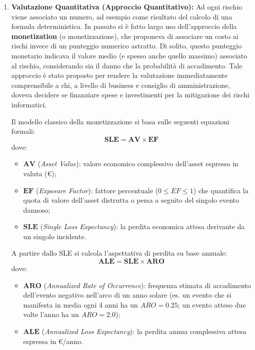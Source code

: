 \documentclass[../../main.tex]{subfiles}
\begin{document}
\begin{enumerate}
    \item \textbf{Valutazione Quantitativa (Approccio Quantitativo):} Ad ogni rischio viene associato un numero, ad esempio come risultato del calcolo di una formula deterministica. In passato si è fatto largo uso dell'approccio della \textbf{monetization} (o monetizzazione), che proponeva di associare un costo ai rischi invece di un punteggio numerico astratto. Di solito, questo punteggio monetario indicava il valore medio (e spesso anche quello massimo) associato al rischio, considerando sia il danno che la probabilità di accadimento. Tale approccio è stato proposto per rendere la valutazione immediatamente comprensibile a chi, a livello di business e consiglio di amministrazione, doveva decidere se finanziare spese e investimenti per la mitigazione dei rischi informatici.
    
    Il modello classico della monetizzazione si basa sulle seguenti equazioni formali:
    \begin{equation}
        \mathbf{SLE} = \mathbf{AV} \times \mathbf{EF}
    \end{equation}
    dove:
    \begin{itemize}
        \item $\mathbf{AV}$ (\textit{Asset Value}): valore economico complessivo dell'asset espresso in valuta (\euro);
        \item $\mathbf{EF}$ (\textit{Exposure Factor}): fattore percentuale ($0 \le EF \le 1$) che quantifica la quota di valore dell'asset distrutta o persa a seguito del singolo evento dannoso;
        \item $\mathbf{SLE}$ (\textit{Single Loss Expectancy}): la perdita economica attesa derivante da un singolo incidente.
    \end{itemize}
    
    A partire dallo SLE si calcola l'aspettativa di perdita su base annuale:
    \begin{equation}
        \mathbf{ALE} = \mathbf{SLE} \times \mathbf{ARO}
    \end{equation}
    dove:
    \begin{itemize}
        \item $\mathbf{ARO}$ (\textit{Annualized Rate of Occurrence}): frequenza stimata di accadimento dell'evento negativo nell'arco di un anno solare (es. un evento che si manifesta in media ogni 4 anni ha un $ARO = 0.25$; un evento atteso due volte l'anno ha un $ARO = 2.0$);
        \item $\mathbf{ALE}$ (\textit{Annualized Loss Expectancy}): la perdita annua complessiva attesa espressa in \euro/anno.
    \end{itemize}
    

\end{enumerate}
\end{document}
